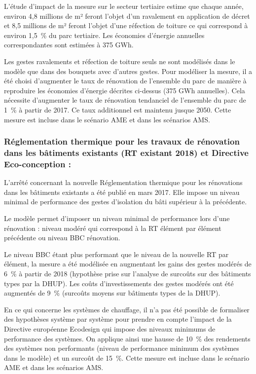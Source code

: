 \documentclass[10.5pt,a4paper]{article}
\begin{document}
{L’étude d’impact de la mesure sur le secteur tertiaire estime que chaque année, environ 4,8 millions de m² feront l’objet d’un ravalement en application de décret et 8,5 millions de m² feront l’objet d’une réfection de toiture ce qui correspond à environ 1,5~\%  du parc tertiaire. Les économies d’énergie annuelles correspondantes sont estimées à 375 GWh. 

Les gestes ravalements et réfection de toiture seuls ne sont modélisés dans le modèle que dans des bouquets avec d’autres gestes. Pour modéliser la mesure, il a été choisi d’augmenter le taux de rénovation de l’ensemble du parc de manière à reproduire les économies d’énergie décrites ci-dessus (375 GWh annuelles). Cela nécessite d’augmenter le taux de rénovation tendanciel de l’ensemble du parc de 1~\% à partir de 2017. Ce taux additionnel est maintenu jusque 2050. Cette mesure est incluse dans le scénario AME et dans les scénarios AMS. 

\subsubsection{Réglementation thermique pour les travaux de rénovation dans les bâtiments existants (RT existant 2018) et Directive Eco-conception :}

L’arrêté concernant la nouvelle Réglementation thermique pour les rénovations dans les bâtiments existants a été publié en mars 2017. Elle impose un niveau minimal de performance des gestes d'isolation du bâti supérieur à la précédente.

Le modèle permet d’imposer un niveau minimal de performance lors d’une rénovation : niveau modéré qui correspond à la RT élément par élément précédente ou niveau BBC rénovation. 

Le niveau BBC étant plus performant que le niveau de la nouvelle RT par élément, la mesure a été modélisée en augmentant les gains des gestes modérés de 6~\%  à partir de 2018 (hypothèse prise sur l’analyse de surcoûts sur des bâtiments types par la DHUP). Les coûts d’investissements des gestes modérés ont été augmentés de 9~\%  (surcoûts moyens sur bâtiments types de la DHUP). 

En ce qui concerne les systèmes de chauffage, il n’a pas été possible de formaliser des hypothèses système par système pour prendre en compte l'impact de la Directive européenne Ecodesign qui impose des niveaux minimums de performance des systèmes. On applique ainsi une hausse de 10~\%  des rendements des systèmes non performants (niveau de performance minimum des systèmes dans le modèle) et un surcoût de 15~\%. Cette mesure est incluse dans le scénario AME et dans les scénarios AMS. 

}
\end{document}
